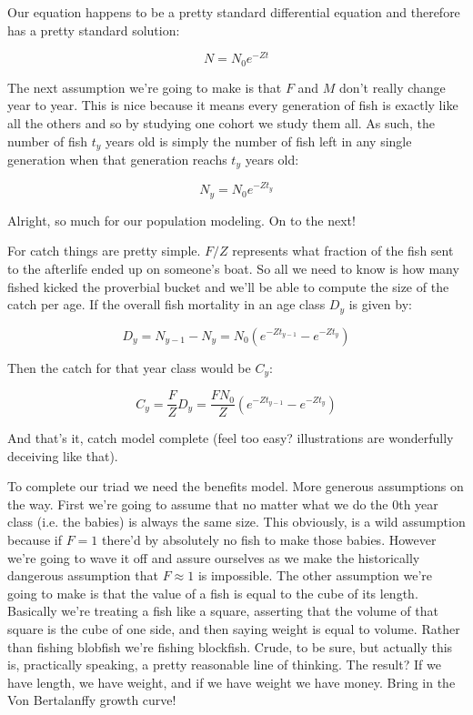 \documentclass[11pt,a5paper]{book}
\begin{document}
Our equation happens to be a pretty standard differential equation and therefore has a pretty standard solution:

$$N = N_0 e^{-Zt}$$

The next assumption we're going to make is that $F$ and $M$ don't really change year to year. This is nice because it means every generation of fish is exactly like all the others and so by studying one cohort we study them all. As such, the number of fish $t_y$ years old is simply the number of fish left in any single generation when that generation reachs $t_y$ years old:

$$N_y = N_0 e^{-Zt_y}$$

Alright, so much for our population modeling. On to the next!
\newline

For catch things are pretty simple. $F/Z$ represents what fraction of the fish sent to the afterlife ended up on someone's boat. So all we need to know is how many fished kicked the proverbial bucket and we'll be able to compute the size of the catch per age. If the overall fish mortality in an age class $D_y$ is given by:

$$D_y = N_{y-1} - N_y =N_0(e^{-Zt_{y-1}}- e^{-Zt_y})$$

Then the catch for that year class would be $C_y$:

$$C_y = \frac{F}{Z} D_y = \frac{FN_0}{Z}(e^{-Zt_{y-1}}- e^{-Zt_y})$$

And that's it, catch model complete (feel too easy? illustrations are wonderfully deceiving like that).
\newline

To complete our triad we need the benefits model. More generous assumptions on the way. First we're going to assume that no matter what we do the 0th year class (i.e. the babies) is always the same size. This obviously, is a wild assumption because if $F=1$ there'd by absolutely no fish to make those babies. However we're going to wave it off and assure ourselves as we make the historically dangerous assumption that $F\approx 1$ is impossible. The other assumption we're going to make is that the value of a fish is equal to the cube of its length. Basically we're treating a fish like a square, asserting that the volume of that square is the cube of one side, and then saying weight is equal to volume. Rather than fishing blobfish we're fishing blockfish. Crude, to be sure, but actually this is, practically speaking, a pretty reasonable line of thinking. The result? If we have length, we have weight, and if we have weight we have money. Bring in the Von Bertalanffy growth curve!
\end{document}

